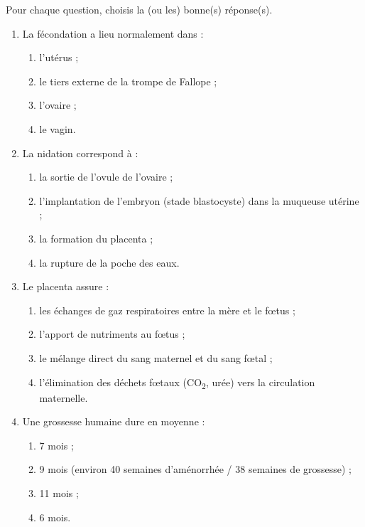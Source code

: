 \documentclass[11pt]{article}
\begin{document}
\begin{exercice}
Pour chaque question, choisis la (ou les) bonne(s) réponse(s).
\begin{enumerate}
\item La fécondation a lieu normalement dans :
\begin{enumerate}
\item l'utérus ; \item le tiers externe de la trompe de Fallope ; \item l'ovaire ; \item le vagin.
\end{enumerate}
\item La nidation correspond à :
\begin{enumerate}
\item la sortie de l'ovule de l'ovaire ; \item l'implantation de l'embryon (stade blastocyste) dans la muqueuse utérine ; \item la formation du placenta ; \item la rupture de la poche des eaux.
\end{enumerate}
\item Le placenta assure :
\begin{enumerate}
\item les échanges de gaz respiratoires entre la mère et le fœtus ; \item l'apport de nutriments au fœtus ; \item le mélange direct du sang maternel et du sang fœtal ; \item l'élimination des déchets fœtaux (CO\textsubscript{2}, urée) vers la circulation maternelle.
\end{enumerate}
\item Une grossesse humaine dure en moyenne :
\begin{enumerate}
\item 7 mois ; \item 9 mois (environ 40 semaines d'aménorrhée / 38 semaines de grossesse) ; \item 11 mois ; \item 6 mois.
\end{enumerate}
\end{enumerate}
\end{exercice}
\end{document}
